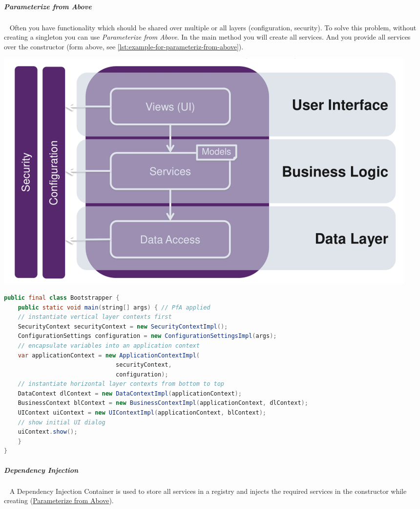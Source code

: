 \documentclass[11pt,twoside,landscape]{article}
\begin{document}
\begin{multicols}{3}
\subparagraph{Parameterize from Above} \
\label{sec:org6458356}
Often you have functionality which should be shared over multiple or all layers (configuration, security).
To solve this problem, without creating a singleton you can use \emph{Parameterize from Above}.
In the main method you will create all services.
And you provide all services over the constructor (form above, see \autoref{lst:example-for-parameteriz-from-above}).

{
\begin{center}
\includegraphics[width=.9\linewidth]{img/vertical_and_horizontal_layering.png}
\end{center}
\label{fig:horizontal-and-vertical-layering}
}

\begin{lstlisting}[language=java,label=lst:example-for-parameteriz-from-above,caption={Example for Parameteriz from Above},captionpos=b,numbers=none]
public final class Bootstrapper {
    public static void main(string[] args) { // PfA applied
	// instantiate vertical layer contexts first
	SecurityContext securityContext = new SecurityContextImpl();
	ConfigurationSettings configuration = new ConfigurationSettingsImpl(args);
	// encapsulate variables into an application context
	var applicationContext = new ApplicationContextImpl(
							    securityContext,
							    configuration);
	// instantiate horizontal layer contexts from bottom to top
	DataContext dlContext = new DataContextImpl(applicationContext);
	BusinessContext blContext = new BusinessContextImpl(applicationContext, dlContext);
	UIContext uiContext = new UIContextImpl(applicationContext, blContext);
	// show initial UI dialog
	uiContext.show();
    }
}
\end{lstlisting}
\subparagraph{Dependency Injection} \
\label{sec:orge14ed24}
A Dependency Injection Container is used to store all services in a registry and injects the required services in the constructor while creating (\href{../../../roam/20230125163949-how_to_share_classes_over_multiple_layers.org}{Parameterize from Above}).


\end{multicols}
\end{document}
